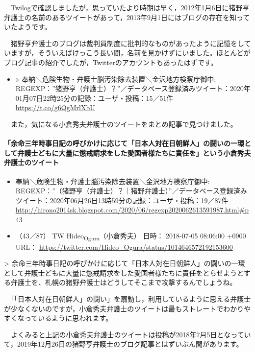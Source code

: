 \documentclass[]{ltjarticle}
\let\oldparagraph\paragraph
\renewcommand{\paragraph}[1]{\oldparagraph{#1}\mbox{}}
\begin{document}
　Twilogで確認しましたが，思っていたより時期は早く，2012年1月6日に猪野亨弁護士の名前のあるツイートがあって，2013年9月1日にはブログの存在を知っていたようです。

　猪野亨弁護士のブログは裁判員制度に批判的なものがあったように記憶をしていますが，そういえばけっこう長い間，名前を見かけずにいました。ほとんどがブログ記事の紹介でしたが，Twitterのアカウントもあったはずです。

\begin{itemize}
\item » 奉納＼危険生物・弁護士脳汚染除去装置＼金沢地方検察庁御中: REGEXP：”猪野亨（弁護士）？”／データベース登録済みツイート：2020年01月07日22時25分の記録：ユーザ・投稿：15／51件 \url{https://t.co/g6QgMrlXbU}
\end{itemize}

　また，気になる小倉秀夫弁護士のツイートをまとめ記事で見つけました。

\paragraph{「余命三年時事日記の呼びかけに応じて「日本人対在日朝鮮人」の闘いの一環として弁護士どもに大量に懲戒請求をした愛国者様たちに責任を」という小倉秀夫弁護士のツイート}
\label{sec:org6753729}

\begin{itemize}
\item 奉納＼危険生物・弁護士脳汚染除去装置＼金沢地方検察庁御中: REGEXP：”（猪野亨（弁護士）？｜猪野弁護士）”／データベース登録済みツイート：2020年06月26日13時59分の記録：ユーザ・投稿：19／87件 \url{http://hirono2014sk.blogspot.com/2020/06/regexp2020062613591987.html\#p43}

\item （43／87） TW Hideo\textsubscript{Ogura}（小倉秀夫） 日時： 2018-07-05 08:06:00 +0900 URL： \url{https://twitter.com/Hideo\_Ogura/status/1014646572192153600}
\end{itemize}

> 余命三年時事日記の呼びかけに応じて「日本人対在日朝鮮人」の闘いの一環として弁護士どもに大量に懲戒請求をした愛国者様たちに責任をとらせようとする弁護士を、札幌の猪野弁護士はどうしてそこまで攻撃するんでしょうね。

　「「日本人対在日朝鮮人」の闘い」を扇動し，利用しているように思える弁護士が少なくないのですが，小倉秀夫弁護士のツイートは最もストレートでわかりやすくなっているように思われます。

　よくみると上記の小倉秀夫弁護士のツイートは投稿が2018年7月5日となっていて，2019年12月26日の猪野亨弁護士のブログ記事とはずいぶん間があります。
\end{document}
